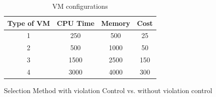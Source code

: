 \begin{table}[]
\centering
\caption{VM configurations}
\label{tab:vm}
\begin{tabular}{@{}cccc@{}}
\toprule
Type of VM & CPU Time & Memory & Cost \\ \midrule
1       & 250      & 500    & 25 \\
2       & 500      & 1000   & 50 \\
3       & 1500     & 2500   & 150\\
4       & 3000     & 4000   & 300\\ \bottomrule
\end{tabular}
\end{table}
\begin{flushleft}Selection Method with violation Control vs. without violation control\end{flushleft}
